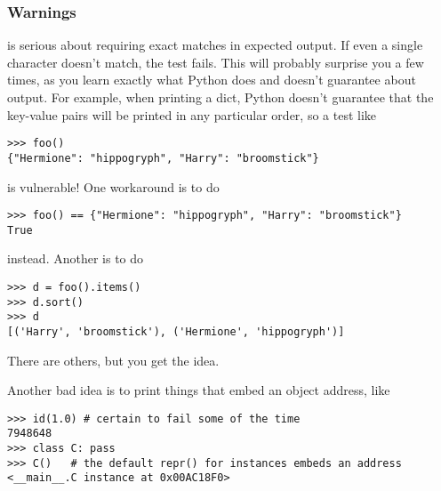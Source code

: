
\subsubsection{Warnings\label{doctest-warnings}}

 is serious about requiring exact matches in expected
output.  If even a single character doesn't match, the test fails.  This
will probably surprise you a few times, as you learn exactly what Python
does and doesn't guarantee about output.  For example, when printing a
dict, Python doesn't guarantee that the key-value pairs will be printed
in any particular order, so a test like

\begin{verbatim}
>>> foo()
{"Hermione": "hippogryph", "Harry": "broomstick"}
\end{verbatim}

is vulnerable!  One workaround is to do

\begin{verbatim}
>>> foo() == {"Hermione": "hippogryph", "Harry": "broomstick"}
True
\end{verbatim}

instead.  Another is to do

\begin{verbatim}
>>> d = foo().items()
>>> d.sort()
>>> d
[('Harry', 'broomstick'), ('Hermione', 'hippogryph')]
\end{verbatim}

There are others, but you get the idea.

Another bad idea is to print things that embed an object address, like

\begin{verbatim}
>>> id(1.0) # certain to fail some of the time
7948648
>>> class C: pass
>>> C()   # the default repr() for instances embeds an address
<__main__.C instance at 0x00AC18F0>
\end{verbatim}

